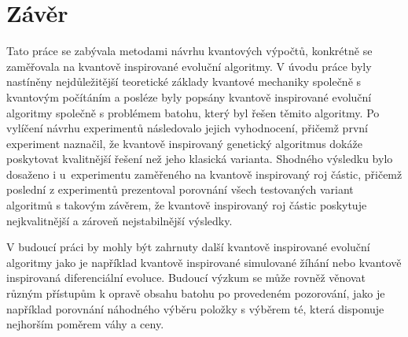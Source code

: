 \chapter{Závěr}
Tato práce se zabývala metodami návrhu kvantových výpočtů, konkrétně se zaměřovala na kvantově inspirované evoluční algoritmy. 
V úvodu práce byly nastíněny nejdůležitější teoretické základy kvantové mechaniky společně s kvantovým počítáním a posléze byly popsány kvantově inspirované evoluční algoritmy společně s problémem batohu, který byl řešen těmito algoritmy. 
Po vylíčení návrhu experimentů následovalo jejich vyhodnocení, přičemž první experiment naznačil, že kvantově inspirovaný genetický algoritmus dokáže poskytovat kvalitnější řešení než jeho klasická varianta. 
Shodného výsledku bylo dosaženo i u~experimentu zaměřeného na kvantově inspirovaný roj částic, přičemž poslední z experimentů prezentoval porovnání všech testovaných variant algoritmů s takovým závěrem, že kvantově inspirovaný roj částic poskytuje nejkvalitnější a zároveň nejstabilnější výsledky. 

V budoucí práci by mohly být zahrnuty další kvantově inspirované evoluční algoritmy jako je například kvantově inspirované simulované žíhání nebo kvantově inspirovaná diferenciální evoluce. 
Budoucí výzkum se může rovněž věnovat různým přístupům k opravě obsahu batohu po provedeném pozorování, jako je například porovnání náhodného výběru položky s výběrem té, která disponuje nejhorším poměrem váhy a ceny. 
